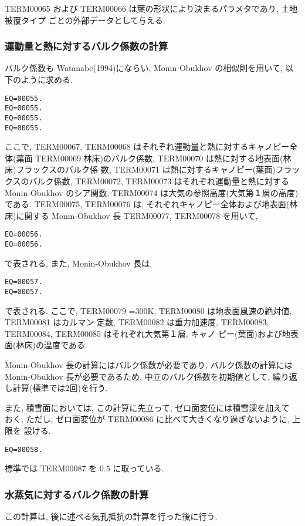TERM00065 および TERM00066 は葉の形状により決まるパラメタであり, 土地被覆タイプ
ごとの外部データとして与える.

\subsubsection{運動量と熱に対するバルク係数の計算}

バルク係数も Watanabe(1994)にならい, Monin-Obukhov の相似則を用いて, 以
下のように求める.
\begin{verbatim}
EQ=00055.
EQ=00055.
EQ=00055.
EQ=00055.
\end{verbatim}
ここで, TERM00067, TERM00068 はそれぞれ運動量と熱に対するキャノピー全体(葉面 TERM00069
林床)のバルク係数, TERM00070 は熱に対する地表面(林床)フラックスのバルク係
数, TERM00071 は熱に対するキャノピー(葉面)フラックスのバルク係数,
TERM00072, TERM00073 はそれぞれ運動量と熱に対する Monin-Obukhov のシア関数,
TERM00074 は大気の参照高度(大気第１層の高度)である.
TERM00075, TERM00076 は, それぞれキャノピー全体および地表面(林床)に関する
Monin-Obukhov 長 TERM00077, TERM00078 を用いて,
\begin{verbatim}
EQ=00056.
EQ=00056.
\end{verbatim}
で表される.
また, Monin-Obukhov 長は,
\begin{verbatim}
EQ=00057.
EQ=00057.
\end{verbatim}
で表される.
ここで, TERM00079 =300K, TERM00080 は地表面風速の絶対値, TERM00081 はカルマン
定数, TERM00082 は重力加速度, TERM00083, TERM00084, TERM00085 はそれぞれ大気第１層, キャノ
ピー(葉面)および地表面(林床)の温度である.

Monin-Obukhov 長の計算にはバルク係数が必要であり, バルク係数の計算には
Monin-Obukhov 長が必要であるため, 中立のバルク係数を初期値として, 繰り返
し計算(標準では2回)を行う.

また, 積雪面においては, この計算に先立って, ゼロ面変位には積雪深を加えて
おく, ただし, ゼロ面変位が TERM00086 に比べて大きくなり過ぎないように, 上限を
設ける.
\begin{verbatim}
EQ=00058.
\end{verbatim}
標準では TERM00087 を 0.5 に取っている.

\subsubsection{水蒸気に対するバルク係数の計算}

この計算は, 後に述べる気孔抵抗の計算を行った後に行う.

